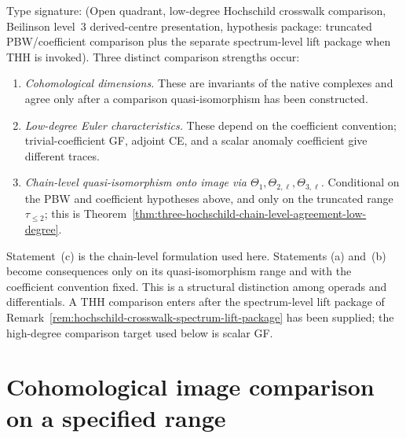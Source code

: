 \begin{remark}
\label{rem:three-hochschild-agreement-precision}
Type signature: \textup{(}Open quadrant, low-degree Hochschild
crosswalk comparison, Beilinson level~$3$ derived-centre presentation,
hypothesis package: truncated PBW/coefficient comparison plus the
separate spectrum-level lift package when THH is invoked\textup{)}.
Three distinct comparison strengths occur:
\begin{enumerate}[label=\textup{(\alph*)}]
\item \emph{Cohomological dimensions.}  These are invariants of the
native complexes and agree only after a comparison quasi-isomorphism
has been constructed.
\item \emph{Low-degree Euler characteristics.}  These depend on the
coefficient convention; trivial-coefficient GF, adjoint CE, and a
scalar anomaly coefficient give different traces.
\item \emph{Chain-level quasi-isomorphism onto image via
 $\Theta_1,\Theta_{2,\ell},\Theta_{3,\ell}$.} Conditional on the PBW
 and coefficient hypotheses above, and only on the truncated range
 $\tau_{\le 2}$; this is
 Theorem~\ref{thm:three-hochschild-chain-level-agreement-low-degree}.
\end{enumerate}
Statement~(c) is the chain-level formulation used here.  Statements
(a) and~(b) become consequences only on its quasi-isomorphism range
and with the coefficient convention fixed. This is a structural
distinction among operads and differentials. A THH comparison enters
after the spectrum-level lift
package of Remark~\ref{rem:hochschild-crosswalk-spectrum-lift-package}
has been supplied; the high-degree comparison target used below is
scalar GF.
\end{remark}

\section{Cohomological image comparison on a specified range}
\label{sec:three-hochschild-all-degree}

